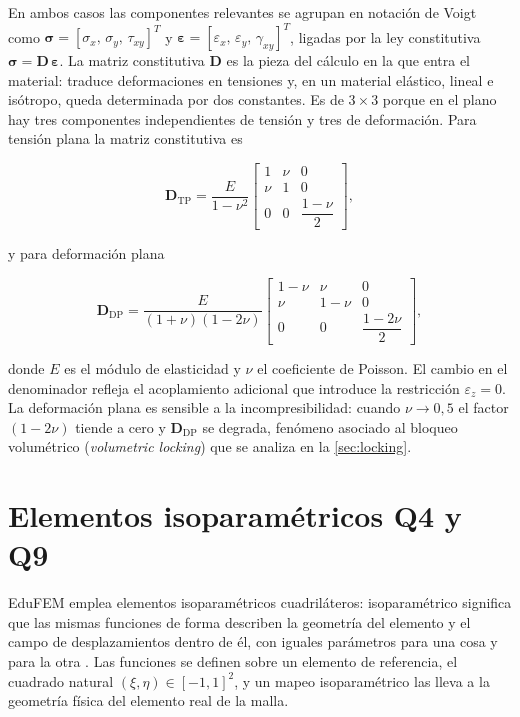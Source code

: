 En ambos casos las componentes relevantes se agrupan en notación de Voigt como $\bm{\sigma} = [\sigma_x,\, \sigma_y,\, \tau_{xy}]^T$ y $\bm{\varepsilon} = [\varepsilon_x,\, \varepsilon_y,\, \gamma_{xy}]^T$, ligadas por la ley constitutiva $\bm{\sigma} = \bm{D}\,\bm{\varepsilon}$. La matriz constitutiva $\bm{D}$ es la pieza del cálculo en la que entra el material: traduce deformaciones en tensiones y, en un material elástico, lineal e isótropo, queda determinada por dos constantes. Es de $3\times3$ porque en el plano hay tres componentes independientes de tensión y tres de deformación. Para tensión plana la matriz constitutiva es

\begin{equation}
\bm{D}_{\text{TP}} = \frac{E}{1-\nu^{2}}
\begin{bmatrix}
1 & \nu & 0 \\
\nu & 1 & 0 \\
0 & 0 & \dfrac{1-\nu}{2}
\end{bmatrix},
\label{eq:D-tension-plana}
\end{equation}

y para deformación plana

\begin{equation}
\bm{D}_{\text{DP}} = \frac{E}{(1+\nu)(1-2\nu)}
\begin{bmatrix}
1-\nu & \nu & 0 \\
\nu & 1-\nu & 0 \\
0 & 0 & \dfrac{1-2\nu}{2}
\end{bmatrix},
\label{eq:D-deformacion-plana}
\end{equation}

donde $E$ es el módulo de elasticidad y $\nu$ el coeficiente de Poisson. El cambio en el denominador refleja el acoplamiento adicional que introduce la restricción $\varepsilon_z = 0$. La deformación plana es sensible a la incompresibilidad: cuando $\nu \to 0{,}5$ el factor $(1-2\nu)$ tiende a cero y $\bm{D}_{\text{DP}}$ se degrada, fenómeno asociado al bloqueo volumétrico (\emph{volumetric locking}) que se analiza en la \autoref{sec:locking}.

\section{Elementos isoparamétricos Q4 y Q9}
\label{sec:isoparametricos}

EduFEM emplea elementos isoparamétricos cuadriláteros: isoparamétrico significa que las mismas funciones de forma describen la geometría del elemento y el campo de desplazamientos dentro de él, con iguales parámetros para una cosa y para la otra \autocites[p.~339]{bathe2014fem}[p.~187]{onate2009structural}. Las funciones se definen sobre un elemento de referencia, el cuadrado natural $(\xi, \eta) \in [-1, 1]^2$, y un mapeo isoparamétrico las lleva a la geometría física del elemento real de la malla.

